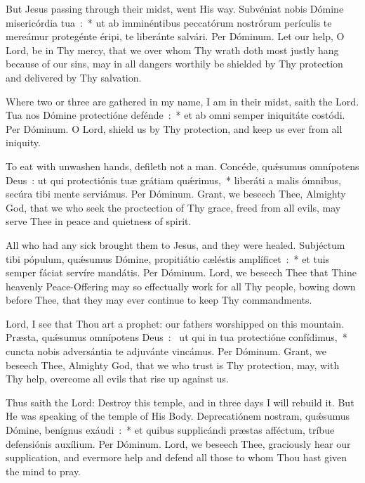 {{  
  {But Jesus passing through their midst, went His way.}
  {Subvéniat nobis Dómine misericórdia tua~:~* ut ab imminéntibus peccatórum nostrórum perículis te mereámur protegénte éripi, te liberánte salvári. Per Dóminum.}
  {Let our help, O Lord, be in Thy mercy, that we over whom Thy wrath doth most justly hang because of our sins, may in all dangers worthily be shielded by Thy protection and delivered by Thy salvation.}

  {Where two or three are gathered in my name, I am in their midst, saith the Lord.}
  {Tua nos Dómine protectióne defénde~:~* et ab omni semper iniquitáte costódi. Per Dóminum.}
  {O Lord, shield us by Thy protection, and keep us ever from all iniquity.}

  {To eat with unwashen hands, defileth not a man.}
  {Concéde, quǽsumus omnípotens Deus~: ut qui protectiónis tuæ grátiam quǽrimus,~* liberáti a malis ómnibus, secúra tibi mente serviámus. Per Dóminum.}
  {Grant, we beseech Thee, Almighty God, that we who seek the proctection of Thy grace, freed from all evils, may serve Thee in peace and quietness of spirit.}

  {All who had any sick brought them to Jesus, and they were healed.}
  {Subjéctum tibi pópulum, quǽsumus Dómine, propitiátio cæléstis amplíficet~:~* et tuis semper fáciat servíre mandátis. Per Dóminum.}
  {Lord, we beseech Thee that Thine heavenly Peace-Offering may so effectually work for all Thy people, bowing down before Thee, that they may ever continue to keep Thy commandments.}

  {Lord, I see that Thou art a prophet: our fathers worshipped on this mountain.}
  {Præsta, quǽsumus omnípotens Deus~:~\dag{} ut qui in tua protectióne confídimus,~* cuncta nobis adversántia te adjuvánte vincámus. Per Dóminum.}
  {Grant, we beseech Thee, Almighty God, that we who trust is Thy protection, may, with Thy help, overcome all evils that rise up against us.}

  {Thus saith the Lord: Destroy this temple, and in three days I will rebuild it. But He was speaking of the temple of His Body.}
  {Deprecatiónem nostram, quǽ\-su\-mus Dómine, benígnus exáudi~:~* et quibus supplicándi præstas afféctum, tríbue defensiónis auxílium. Per Dóminum.}
  {Lord, we beseech Thee, graciously hear our supplication, and evermore help and defend all those to whom Thou hast given the mind to pray.}

}}
